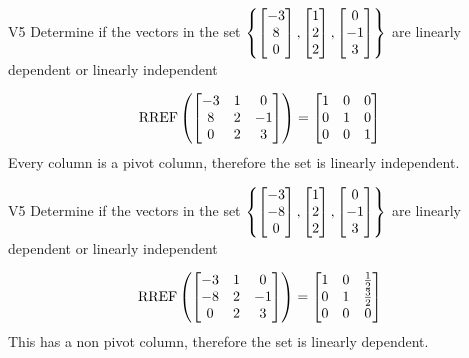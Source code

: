 \begin{problem}{V5}
Determine if the vectors in the set \(\left\{ \begin{bmatrix} -3 \\ 8 \\ 0 \end{bmatrix}, \begin{bmatrix} 1 \\ 2 \\ 2 \end{bmatrix}, \begin{bmatrix} 0 \\ -1 \\ 3 \end{bmatrix} \right\}\) are  linearly dependent or linearly independent
\end{problem}
\begin{solution}
\[\operatorname{RREF}\left( \begin{bmatrix}-3 & 1 & 0 \\ 8 & 2 & -1 \\ 0 & 2 & 3 \end{bmatrix}\right) = \begin{bmatrix} 1 & 0 & 0 \\ 0 & 1 & 0 \\ 0 & 0 & 1 \end{bmatrix}\]
Every column is a pivot column, therefore the set is linearly independent.
\end{solution}

\begin{problem}{V5}
Determine if the vectors in the set \(\left\{ \begin{bmatrix} -3 \\ -8 \\ 0 \end{bmatrix}, \begin{bmatrix} 1 \\ 2 \\ 2 \end{bmatrix}, \begin{bmatrix} 0 \\ -1 \\ 3 \end{bmatrix} \right\}\) are  linearly dependent or linearly independent
\end{problem}
\begin{solution}
\[\operatorname{RREF}\left( \begin{bmatrix}-3 & 1 & 0 \\ -8 & 2 & -1 \\ 0 & 2 & 3 \end{bmatrix}\right) = \begin{bmatrix} 1 & 0 & \frac{1}{2} \\ 0 & 1 & \frac{3}{2} \\ 0 & 0 & 0 \end{bmatrix}\]
This has a non pivot column, therefore the set is linearly dependent.
\end{solution}



